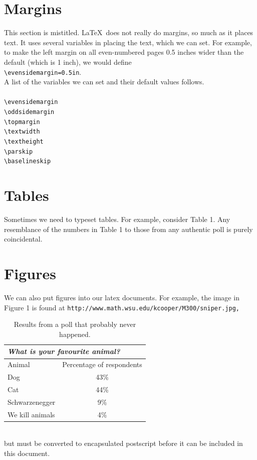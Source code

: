 \documentclass[12pt,A4]{article}
\begin{document}
	\section{Margins}
	This section is mistitled. \LaTeX \ does not really do margins, so much as it
	places text. It uses several variables in placing the text, which we can set.
	For example, to make the left margin on all even-numbered pages 0.5 inches
	wider than the default (which is 1 inch), we would define\\
	\verb|\evensidemargin=0.5in|.\\
	A list of the variables we can set and their default values follows.\\ \\
	\verb|\evensidemargin| \\
	\verb|\oddsidemargin| \\
	\verb|\topmargin| \\
	\verb|\textwidth| \\
	\verb|\textheight| \\
	\verb|\parskip| \\
	\verb|\baselineskip|
	
	\section{Tables}
	Sometimes we need to typeset tables. For example, consider Table 1. Any
	resemblance of the numbers in Table 1 to those from any authentic poll is
	purely coincidental.
	
	\section{Figures}
	We can also put figures into our latex documents. For example, the image in
	Figure 1 is found at \verb|http://www.math.wsu.edu/kcooper/M300/sniper.jpg,|
	\pagebreak
	\begin{table}
		\centering
		\caption{Results from a poll that probably never happened.}
		\begin{tabular}{||l|c||}
			\hline
			\multicolumn{2}{||l||}{\textit{What is your favourite animal?}}\\ \hline
			Animal & Percentage of respondents\\ \hline
			Dog & 43\% \\
			Cat & 44\% \\
			Schwarzenegger & 9\% \\
			We kill animals & 4\% \\\hline\hline
		\end{tabular}
	\end{table} \\
	but must be converted to encapsulated postscript before it can be included in this document.
	
\end{document}
